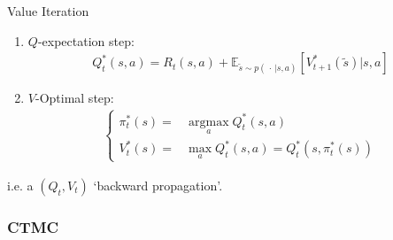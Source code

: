 \begin{itemize}[topsep=2pt,itemsep=0pt]
\begin{algorithm}{Value Iteration}
\begin{enumerate}[topsep=2pt,itemsep=2pt]
\begin{enumerate}[topsep=2pt,itemsep=2pt]
                \item $ Q $-expectation step:
                \begin{align}
                  Q^*_t(s,a)=R_t(s,a)+\mathbb{E}_{\tilde{s}\sim p(\, \cdot \, |s,a)}\left[ V^*_{t+1}(\tilde{s}) \big|s,a\right]    
                \end{align}
                \item $ V $-Optimal step:
                \begin{align}
                     \begin{cases}
                        \pi^*_t(s)=&\mathop{\arg\max}\limits_{a}Q_t^*(s,a)\\
                        V^*_t(s)= & \mathop{\max}\limits_{a} Q^*_t(s,a)=Q^*_{t}(s,\pi^*_t(s)) 
                     \end{cases}
                \end{align}
            \end{enumerate}
            i.e. a $ (Q_t,V_t) $ `backward propagation'.
        \end{enumerate}
    \end{algorithm}
        
    
    
    
    
\end{itemize}

    

 
















 

\subsubsection{CTMC}


    



    










 









